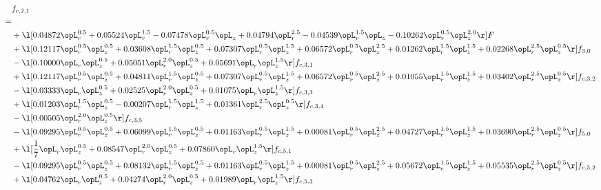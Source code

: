 \begin{alignat}{2} 
\label{eq:f_21_2} 
& f_{c,2,1} \nonumber \\ 
 = \\ 
& + \l[  0.04872 \opL_r^{0.5} +  0.05524 \opL_r^{1.5}   -0.07478 \opL_r^{0.5} \opL_z +  0.04794 \opL_r^{2.5}   -0.04539 \opL_r^{1.5} \opL_z   -0.10262 \opL_r^{0.5} \opL_z^{2.0}  \r] F \nonumber \\ 
& + \l[  0.12117 \opL_r^{0.5} \opL_z^{0.5} +  0.03608 \opL_r^{1.5} \opL_z^{0.5} +  0.07307 \opL_r^{0.5} \opL_z^{1.5} +  0.06572 \opL_r^{0.5} \opL_z^{2.5} +  0.01262 \opL_r^{1.5} \opL_z^{1.5} +  0.02268 \opL_r^{2.5} \opL_z^{0.5}  \r] f_{3,0} \nonumber \\ 
& - \l[  0.10000 \opL_r \opL_z^{0.5} +  0.05051 \opL_r^{2.0} \opL_z^{0.5} +  0.05691 \opL_r \opL_z^{1.5}  \r] f_{c,3,1} \nonumber \\ 
& + \l[  0.12117 \opL_r^{0.5} \opL_z^{0.5} +  0.04811 \opL_r^{1.5} \opL_z^{0.5} +  0.07307 \opL_r^{0.5} \opL_z^{1.5} +  0.06572 \opL_r^{0.5} \opL_z^{2.5} +  0.01055 \opL_r^{1.5} \opL_z^{1.5} +  0.03402 \opL_r^{2.5} \opL_z^{0.5}  \r] f_{c,3,2} \nonumber \\ 
& - \l[  0.03333 \opL_r \opL_z^{0.5} +  0.02525 \opL_r^{2.0} \opL_z^{0.5} +  0.01075 \opL_r \opL_z^{1.5}  \r] f_{c,3,3} \nonumber \\ 
& + \l[  0.01203 \opL_r^{1.5} \opL_z^{0.5}   -0.00207 \opL_r^{1.5} \opL_z^{1.5} +  0.01361 \opL_r^{2.5} \opL_z^{0.5}  \r] f_{c,3,4} \nonumber \\ 
& - \l[  0.00505 \opL_r^{2.0} \opL_z^{0.5}  \r] f_{c,3,5} \nonumber \\ 
& - \l[  0.09295 \opL_r^{0.5} \opL_z^{0.5} +  0.06099 \opL_r^{1.5} \opL_z^{0.5} +  0.01163 \opL_r^{0.5} \opL_z^{1.5} +  0.00081 \opL_r^{0.5} \opL_z^{2.5} +  0.04727 \opL_r^{1.5} \opL_z^{1.5} +  0.03690 \opL_r^{2.5} \opL_z^{0.5}  \r] f_{5,0} \nonumber \\ 
& + \l[ \frac{1}{7} \opL_r \opL_z^{0.5} +  0.08547 \opL_r^{2.0} \opL_z^{0.5} +  0.07860 \opL_r \opL_z^{1.5}  \r] f_{c,5,1} \nonumber \\ 
& - \l[  0.09295 \opL_r^{0.5} \opL_z^{0.5} +  0.08132 \opL_r^{1.5} \opL_z^{0.5} +  0.01163 \opL_r^{0.5} \opL_z^{1.5} +  0.00081 \opL_r^{0.5} \opL_z^{2.5} +  0.05672 \opL_r^{1.5} \opL_z^{1.5} +  0.05535 \opL_r^{2.5} \opL_z^{0.5}  \r] f_{c,5,2} \nonumber \\ 
& + \l[  0.04762 \opL_r \opL_z^{0.5} +  0.04274 \opL_r^{2.0} \opL_z^{0.5} +  0.01989 \opL_r \opL_z^{1.5}  \r] f_{c,5,3} \nonumber \\ 

\end{alignat}
